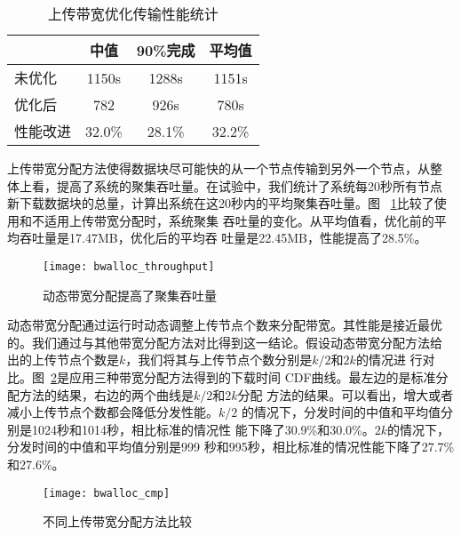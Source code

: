 \begin{table}
\centering
\begin{minipage}{0.8\linewidth}
\centering
\caption{上传带宽优化传输性能统计}
\label{tbl:bwalloc}
\begin{tabular}{lccc}

\toprule[1.5pt]
              & 中值 & 90\%完成 & 平均值\\
\midrule[1pt]
未优化    & 1150s & 1288s & 1151s\\
优化后    & 782   & 926s  & 780s\\
性能改进  & 32.0\% & 28.1\% & 32.2\%\\
\bottomrule[1.5pt]
\end{tabular}
\end{minipage}
\end{table}



上传带宽分配方法使得数据块尽可能快的从一个节点传输到另外一个节点，从整
体上看，提高了系统的聚集吞吐量。在试验中，我们统计了系统每20秒所有节点
新下载数据块的总量，计算出系统在这20秒内的平均聚集吞吐量。图~
\ref{fig:bwalloc_throughput}比较了使用和不适用上传带宽分配时，系统聚集
吞吐量的变化。从平均值看，优化前的平均吞吐量是17.47MB，优化后的平均吞
吐量是22.45MB，性能提高了28.5\%。

\begin{figure}
  \centering
  \begin{minipage}{0.6\linewidth}
    \centering
    \texttt{[image: bwalloc\_throughput]}
    \caption{动态带宽分配提高了聚集吞吐量}
    \label{fig:bwalloc_throughput}
  \end{minipage}
\end{figure}


动态带宽分配通过运行时动态调整上传节点个数来分配带宽。其性能是接近最优
的。我们通过与其他带宽分配方法对比得到这一结论。假设动态带宽分配方法给
出的上传节点个数是$k$，我们将其与上传节点个数分别是$k/2$和$2k$的情况进
行对比。图~\ref{fig:bwalloc_cmp}是应用三种带宽分配方法得到的下载时间
CDF曲线。最左边的是标准分配方法的结果，右边的两个曲线是$k/2$和$2k$分配
方法的结果。可以看出，增大或者减小上传节点个数都会降低分发性能。$k/2$
的情况下，分发时间的中值和平均值分别是1024秒和1014秒，相比标准的情况性
能下降了30.9\%和30.0\%。$2k$的情况下，分发时间的中值和平均值分别是999
秒和995秒，相比标准的情况性能下降了27.7\%和27.6\%。

\begin{figure}
  \centering
  \begin{minipage}{0.6\linewidth}
    \centering
    \texttt{[image: bwalloc\_cmp]}
    \caption{不同上传带宽分配方法比较}
    \label{fig:bwalloc_cmp}
  \end{minipage}
\end{figure}


